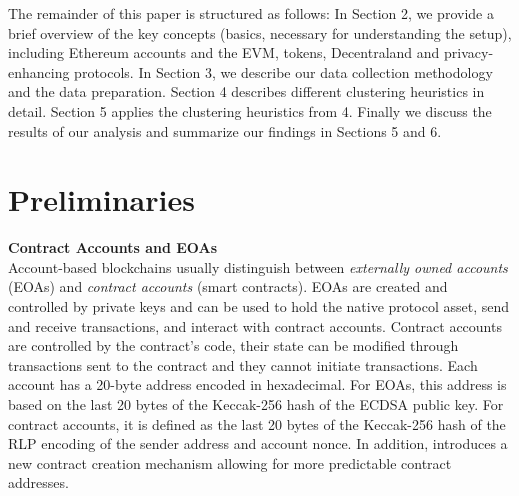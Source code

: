 \documentclass[12pt,a4paper,titlepage,oneside,english]{article}
\begin{document}
The remainder of this paper is structured as follows: In Section 2, we provide a brief overview of the key concepts (basics, necessary for understanding the setup), including Ethereum accounts and the EVM, tokens, Decentraland and privacy-enhancing protocols. In Section 3, we describe our data collection methodology and the data preparation. Section 4  describes different clustering heuristics in detail. Section 5 applies the clustering heuristics from 4. Finally we discuss the results of our analysis and summarize our findings in Sections 5 and 6.





\section{Preliminaries}

\textbf{Contract Accounts and EOAs}\\
Account-based blockchains usually distinguish between \textit{externally owned accounts} (EOAs) and \textit{contract accounts} (smart contracts). EOAs are created and controlled by private keys and can be used to hold the native protocol asset, send and receive transactions, and interact with contract accounts. Contract accounts are controlled by the contract's code, their state can be modified through transactions sent to the contract and they cannot initiate transactions. \citep{buterin2014ethereum} \newline Each account has a 20-byte address encoded in hexadecimal. For EOAs, this address is based on the last 20 bytes of the Keccak-256 hash of the ECDSA public key. For contract accounts, it is defined as the last 20 bytes of the Keccak-256 hash of the RLP encoding of the sender address and account nonce. \citep{GW:14} \newline
In addition, \cite{eip1014} introduces a new contract creation mechanism allowing for more predictable contract addresses.%
\end{document}
